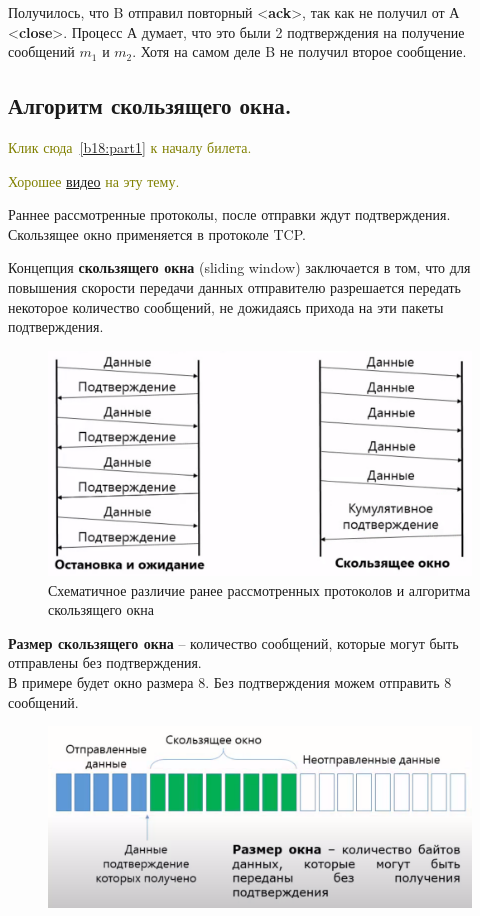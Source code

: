 Получилось, что B отправил повторный <\textbf{ack}>, так как не получил от А  <\textbf{close}>. Процесс А думает, что это были 2 подтверждения на получение сообщений $m_1$ и $m_2$. Хотя на самом деле B не получил второе сообщение.

\subsection*{Алгоритм скользящего окна.}\label{b18:part2}

\textcolor{olive}{Клик сюда~\ref{b18:part1} к началу билета.}

\textcolor{olive}{Хорошее \href{https://www.youtube.com/watch?v=hd6QNXK5rPk}{видео} на эту тему.}

Раннее рассмотренные протоколы, после отправки ждут подтверждения. Скользящее окно применяется в протоколе TCP.

Концепция \textbf{скользящего окна} (sliding window) заключается в том, что для повышения скорости передачи данных отправителю разрешается передать некоторое количество сообщений, не дожидаясь прихода на эти пакеты подтверждения.

\begin{figure}[H] \centering
	\includegraphics[scale = 0.35]{18/send_types.png}
	\caption{Схематичное различие ранее рассмотренных протоколов и алгоритма скользящего окна}
\end{figure}

\textbf{Размер скользящего окна} -- количество сообщений, которые могут быть отправлены без подтверждения. \\
В примере будет окно размера 8. Без подтверждения можем отправить 8 сообщений.
\begin{figure}[H] \centering
	\includegraphics[scale = 0.3]{18/window_1.png}
\end{figure}

